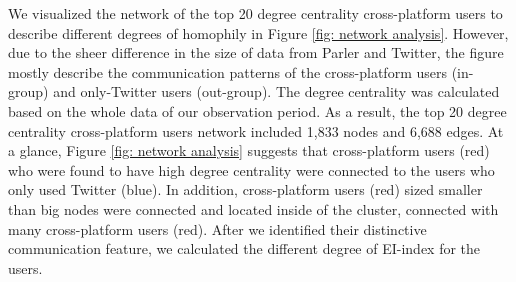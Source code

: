 \documentclass[Crown,sagev,times]{sagej}
\begin{document}
We visualized the network of the top 20 degree centrality cross-platform users to describe different degrees of homophily in Figure \ref{fig: network analysis}. However, due to the sheer difference in the size of data from Parler and Twitter, the figure mostly describe the communication patterns of the cross-platform users (in-group) and only-Twitter users (out-group).
The degree centrality was calculated based on the whole data of our observation period. As a result, the top 20 degree centrality cross-platform users network included 1,833 nodes and 6,688 edges. At a glance, Figure \ref{fig: network analysis} suggests that cross-platform users (red) who were found to have high degree centrality were connected to the users who only used Twitter (blue). In addition, cross-platform users (red) sized smaller than big nodes were connected and located inside of the cluster, connected with many cross-platform users (red). After we identified their distinctive communication feature, we calculated the different degree of EI-index for the users. 
\end{document}
